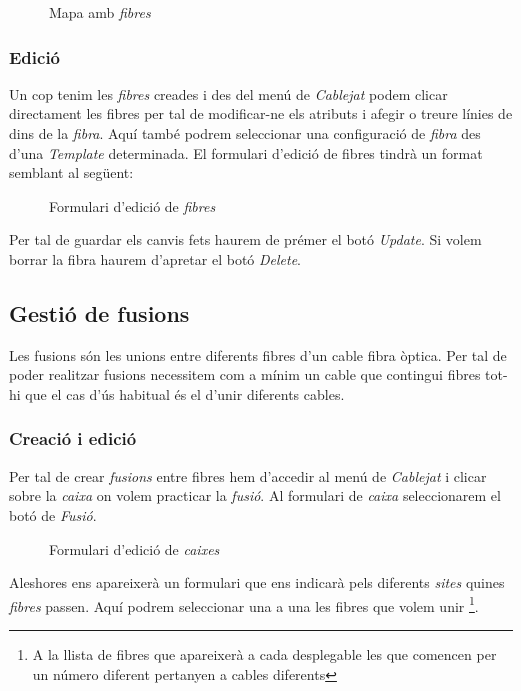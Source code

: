 \documentclass[a4paper]{article}
\begin{document}
	\begin{figure}[H]
		\centering
		\caption{Mapa amb \emph{fibres}}
	\end{figure}
	
	\subsubsection{Edició}
	
	Un cop tenim les \emph{fibres} creades i des del menú de \emph{Cablejat} podem clicar directament les fibres per tal de modificar-ne els atributs i afegir o treure línies de dins de la \emph{fibra}. Aquí també podrem seleccionar una configuració de \emph{fibra} des d'una \emph{Template} determinada. El formulari d'edició de fibres tindrà un format semblant al següent:
	
	\begin{figure}[H]
		\centering
		\caption{Formulari d'edició de \emph{fibres}}
	\end{figure}
	
	Per tal de guardar els canvis fets haurem de prémer el botó \emph{Update}. Si volem borrar la fibra haurem d'apretar el botó \emph{Delete}.
	
	\subsection{Gestió de fusions}
	Les fusions són les unions entre diferents fibres d'un cable fibra òptica. Per tal de poder realitzar fusions necessitem com a mínim un cable que contingui fibres tot-hi que el cas d'ús habitual és el d'unir diferents cables.
	
	\subsubsection{Creació i edició}
	Per tal de crear \emph{fusions} entre fibres hem d'accedir al menú de \emph{Cablejat} i clicar sobre la \emph{caixa} on volem practicar la \emph{fusió}. Al formulari de \emph{caixa} seleccionarem el botó de \emph{Fusió}.
	
	\begin{figure}[H]
		\centering
		\caption{Formulari d'edició de \emph{caixes}}
	\end{figure}

	Aleshores ens apareixerà un formulari que ens indicarà pels diferents \emph{sites} quines \emph{fibres} passen. Aquí podrem seleccionar una a una les fibres que volem unir \footnote{A la llista de fibres que apareixerà a cada desplegable les que comencen per un número diferent pertanyen a cables diferents}.
	
\end{document}
